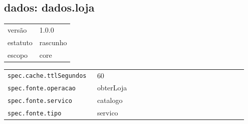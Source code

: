 \subsection*{dados: dados.loja}
\begin{tabular}{@{}ll@{}}
versão & 1.0.0 \\
estatuto & rascunho \\
escopo & core \\
\end{tabular}

\begin{tabular}{@{}p{0.35\linewidth}p{0.6\linewidth}@{}}
\texttt{spec.cache.ttlSegundos} & 60 \\
\texttt{spec.fonte.operacao} & obterLoja \\
\texttt{spec.fonte.servico} & catalogo \\
\texttt{spec.fonte.tipo} & servico \\
\end{tabular}
